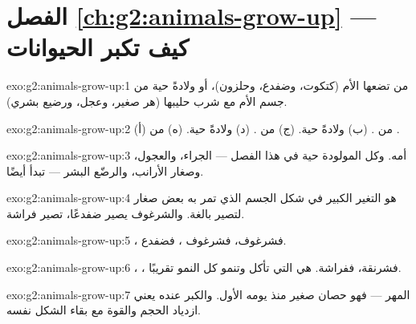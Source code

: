 \section*{الفصل \ref{ch:g2:animals-grow-up} --- كيف تكبر الحيوانات}

\begin{solution}{exo:g2:animals-grow-up:1}
من  تضعها الأم (كتكوت، وضفدع، وحلزون)، أو ولادةً حية من جسم
الأم مع شرب حليبها (هر صغير، وعجل، ورضيع بشري).
\end{solution}

\begin{solution}{exo:g2:animals-grow-up:2}
(أ) من . (ب) ولادةً حية. (ج) من . (د) ولادةً حية.
(ه) من .
\end{solution}

\begin{solution}{exo:g2:animals-grow-up:3}
 أمه. وكل  المولودة حية في هذا الفصل --- الجراء،
والعجول، وصغار الأرانب، والرضّع البشر --- تبدأ  أيضًا.
\end{solution}

\begin{solution}{exo:g2:animals-grow-up:4}
 هو التغير الكبير في شكل الجسم الذي تمر به بعض صغار
 لتصير بالغة. والشرغوف يصير ضفدعًا،  تصير فراشة.
\end{solution}

\begin{solution}{exo:g2:animals-grow-up:5}
، فشرغوف، فشرغوف ، فضفدع.
\end{solution}

\begin{solution}{exo:g2:animals-grow-up:6}
، ، فشرنقة، ففراشة.  هي التي تأكل  وتنمو
كل النمو تقريبًا.
\end{solution}

\begin{solution}{exo:g2:animals-grow-up:7}
المهر --- فهو حصان صغير منذ يومه الأول. والكبر عنده يعني ازدياد
الحجم والقوة مع بقاء الشكل نفسه.
\end{solution}

